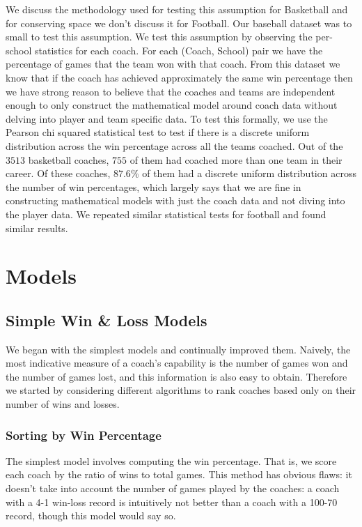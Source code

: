\documentclass[titlepage,12pt]{article}
\begin{document}
We discuss the methodology used for testing this assumption for Basketball and for conserving space we don't discuss it for Football. Our baseball dataset was to small to test this assumption. We test this assumption by observing the per-school statistics for each coach. For each (Coach, School) pair we have the percentage of games that the team won with that coach. From this dataset we know that if the coach has achieved approximately the same win percentage then we have strong reason to believe that the coaches and teams are independent enough to only construct the mathematical model around coach data without delving into player and team specific data. To test this formally, we use the Pearson chi squared statistical test to test if there is a discrete uniform distribution across the win percentage across all the teams coached. Out of the $3513$ basketball coaches, $755$ of them had coached more than one team in their career. Of these coaches, $87.6\%$ of them had a discrete uniform distribution across the number of win percentages, which largely says that we are fine in constructing mathematical models with just the coach data and not diving into the player data. We repeated similar statistical tests for football and found similar results.

\section{Models}

\subsection{Simple Win \& Loss Models}

We began with the simplest models and continually improved them. Naively, the most indicative measure of a coach's capability is the number of games won and the number of games lost, and this information is also easy to obtain. Therefore we started by considering different algorithms to rank coaches based only on their number of wins and losses.

\subsubsection{Sorting by Win Percentage}
The simplest model involves computing the win percentage. That is, we score each coach by the ratio of wins to total games. This method has obvious flaws: it doesn't take into account the number of games played by the coaches: a coach with a 4-1 win-loss record is intuitively not better than a coach with a 100-70 record, though this model would say so.
\end{document}
